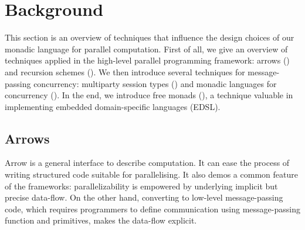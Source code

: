 \chapter{Background} \label{b} \label{chap:b}
This section is an overview of techniques that influence the design choices of our monadic language for parallel computation. First of all, we give an overview of techniques applied in the high-level parallel programming framework: arrows () and recursion schemes (). We then introduce several techniques for message-passing concurrency: multiparty session types () and monadic languages for concurrency (). In the end, we introduce free monads (), a technique valuable in implementing embedded domain-specific languages (EDSL).

\section{Arrows} \label{b:arrows}
Arrow is a general interface to describe computation. It can ease the process of writing structured code suitable for parallelising. It also demos a common feature of the frameworks: parallelizability is empowered by underlying implicit but precise data-flow. On the other hand, converting to low-level message-passing code, which requires programmers to define communication using message-passing function and primitives, makes the data-flow explicit.
